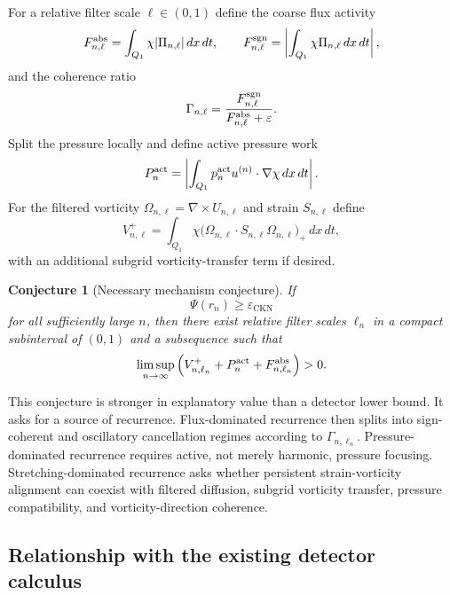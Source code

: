 \documentclass[11pt]{article}
\numberwithin{equation}{section}
\newtheorem{conjecture}[theorem]{Conjecture}
\theoremstyle{remark}
\newcommand{\eps}{\varepsilon}
\newcommand{\CKN}{\mathrm{CKN}}
\newcommand{\dxdt}{\,dx\,dt}
\newcommand{\abs}[1]{\left|#1\right|}
\begin{document}
For a relative filter scale $\ell\in(0,1)$ define the coarse flux activity
\begin{equation}\label{eq:flux-diagnostic}
F_{n,\ell}^{\rm abs}
=
\int_{Q_1}\chi|\Pi_{n,\ell}|\dxdt,
\qquad
F_{n,\ell}^{\rm sgn}
=
\abs{\int_{Q_1}\chi\Pi_{n,\ell}\dxdt},
\end{equation}
and the coherence ratio
\begin{equation}\label{eq:coherence-ratio}
\Gamma_{n,\ell}
=
\frac{F_{n,\ell}^{\rm sgn}}{F_{n,\ell}^{\rm abs}+\eps}.
\end{equation}
Split the pressure locally and define active pressure work
\begin{equation}\label{eq:pressure-diagnostic}
P_n^{\rm act}
=
\abs{\int_{Q_1}p_n^{\rm act}u^{(n)}\cdot\nabla\chi\dxdt}.
\end{equation}
For the filtered vorticity $\Omega_{n,\ell}=\nabla\times U_{n,\ell}$ and strain $S_{n,\ell}$ define
\begin{equation}\label{eq:vortex-diagnostic}
V_{n,\ell}^+
=
\int_{Q_1}\chi
\bigl(\Omega_{n,\ell}\cdot S_{n,\ell}\Omega_{n,\ell}\bigr)_+\dxdt,
\end{equation}
with an additional subgrid vorticity-transfer term if desired.

\begin{conjecture}[Necessary mechanism conjecture]\label{conj:mechanism}
If
\[
\Psi(r_n)\ge\eps_{\CKN}
\]
for all sufficiently large $n$, then there exist relative filter scales $\ell_n$ in a compact subinterval of $(0,1)$ and a subsequence such that
\begin{equation}\label{eq:mechanism-conjecture}
\limsup_{n\to\infty}
\left(
V_{n,\ell_n}^+
+P_n^{\rm act}
+F_{n,\ell_n}^{\rm abs}
\right)>0.
\end{equation}
\end{conjecture}

This conjecture is stronger in explanatory value than a detector lower bound. It asks for a source of recurrence. Flux-dominated recurrence then splits into sign-coherent and oscillatory cancellation regimes according to $\Gamma_{n,\ell_n}$. Pressure-dominated recurrence requires active, not merely harmonic, pressure focusing. Stretching-dominated recurrence asks whether persistent strain-vorticity alignment can coexist with filtered diffusion, subgrid vorticity transfer, pressure compatibility, and vorticity-direction coherence.

\subsection{Relationship with the existing detector calculus}
\end{document}
